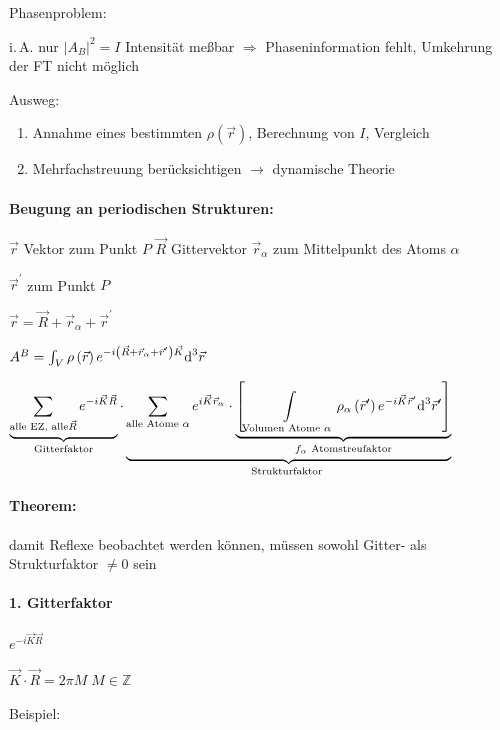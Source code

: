 Phasenproblem:

i.\,A. nur $\left|A_{B}\right|^{2}=I$ Intensit\"at me\ss bar $\Rightarrow$
Phaseninformation fehlt, Umkehrung der FT nicht m\"oglich

Ausweg: 
\begin{enumerate}
\item Annahme eines bestimmten $\rho\left(\vec{r}\right)$, Berechnung von
$I$, Vergleich
\item Mehrfachstreuung ber\"ucksichtigen $\rightarrow$ dynamische Theorie 
\end{enumerate}

\paragraph{Beugung an periodischen Strukturen:}

$\vec{r}$ Vektor zum Punkt $P$ $\vec{R}$ Gittervektor $\vec{r}_{\alpha}$
zum Mittelpunkt des Atoms $\alpha$

$\vec{r}^{\prime}$ zum Punkt $P$ 

$\vec{r}=\vec{R}+\vec{r}_{\alpha}+\vec{r}^{\prime}$

$A^{B}=\intop_{V}\rho\left(\vec{r}\right)e^{-i\left(\vec{R}+\vec{r}_{\alpha}+\vec{r}^{\prime}\right)\vec{K}}\text{d}^{3}\vec{r}$

$\underbrace{\sum_{\text{alle EZ, alle}\vec{R}}e^{-i\vec{K}\vec{R}}}_{\text{Gitterfaktor}}\cdot\underbrace{\sum_{\text{alle Atome }\alpha}e^{i\vec{K}\vec{r}_{\alpha}}\cdot\underbrace{\left[\intop_{\text{Volumen Atome }\alpha}\rho_{\alpha}\left(\vec{r}^{\prime}\right)e^{-i\vec{K}\vec{r}^{\prime}}\text{d}^{3}\vec{r}^{\prime}\right]}_{f_{\alpha}\text{ Atomstreufaktor}}}_{\text{Strukturfaktor }}$


\paragraph{Theorem:}

damit Reflexe beobachtet werden k\"onnen, m\"ussen sowohl Gitter- als
Strukturfaktor $\neq0$ sein 


\paragraph{1. Gitterfaktor}

$e^{-i\vec{K}\vec{R}}$ 

$\vec{K}\cdot\vec{R}=2\pi M\; M\in\mathbb{Z}$

Beispiel:

